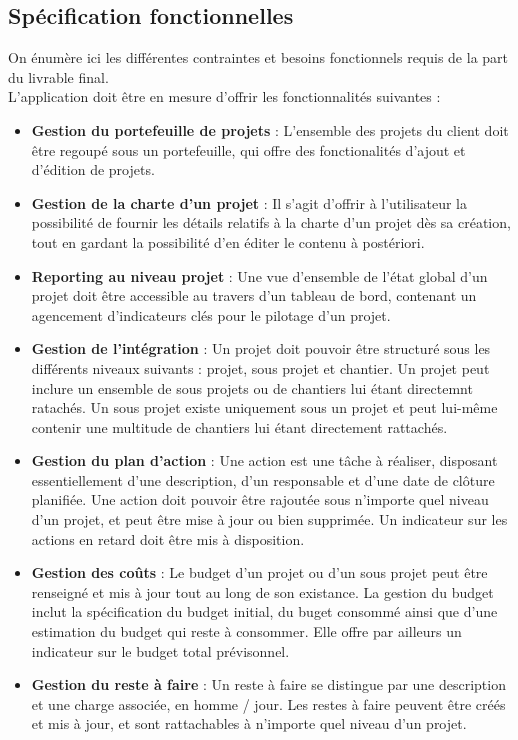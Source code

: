 \begin{spacing}{1.5}
\subsection{Spécification fonctionnelles}
On énumère ici les différentes contraintes et besoins fonctionnels requis de la part du livrable final.\\
L’application doit être en mesure d’offrir les fonctionnalités suivantes :
\begin{itemize}
    \item \textbf{Gestion du portefeuille de projets} : L'ensemble des projets du client doit être regoupé sous un portefeuille, qui offre des fonctionalités d'ajout et d'édition de projets.
    \item \textbf{Gestion de la charte d'un projet} : Il s'agit d'offrir à l'utilisateur la possibilité de fournir les détails relatifs à la charte d'un projet dès sa création, tout en gardant la possibilité d'en éditer le contenu à postériori.
    \item \textbf{Reporting au niveau projet} : Une vue d'ensemble de l'état global d'un projet doit être accessible au travers d'un tableau de bord, contenant un agencement d'indicateurs clés pour le pilotage d'un projet.
    \item \textbf{Gestion de l'intégration} : Un projet doit pouvoir être structuré sous les différents niveaux suivants : projet, sous projet et chantier. Un projet peut inclure un ensemble de sous projets ou de chantiers lui étant directemnt ratachés. Un sous projet existe uniquement sous un projet et peut lui-même contenir une multitude de chantiers lui étant directement rattachés.
    \item \textbf{Gestion du plan d'action} : Une action est une tâche à réaliser, disposant essentiellement d'une description, d'un responsable et d'une date de clôture planifiée. Une action doit pouvoir être rajoutée sous n'importe quel niveau d'un projet, et peut être mise à jour ou bien supprimée. Un indicateur sur les actions en retard doit être mis à disposition.
    \item \textbf{Gestion des coûts} : Le budget d'un projet ou d'un sous projet peut être renseigné et mis à jour tout au long de son existance. La gestion du budget inclut la spécification du budget initial, du buget consommé ainsi que d'une estimation du budget qui reste à consommer. Elle offre par ailleurs un indicateur sur le budget total prévisonnel.
    \item \textbf{Gestion du reste à faire} : Un reste à faire se distingue par une description et une charge associée, en homme / jour. Les restes à faire peuvent être créés et mis à jour, et sont rattachables à n'importe quel niveau d'un projet.

\end{itemize}
\end{spacing}
